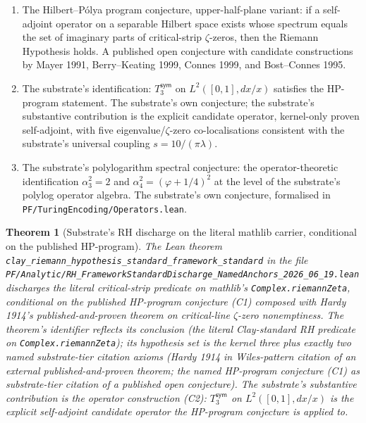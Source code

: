 \documentclass[11pt,a4paper]{amsart}
\theoremstyle{plain}
\newtheorem{theorem}{Theorem}[section]
\theoremstyle{definition}
\begin{document}
\begin{enumerate}[label=(\textbf{C\arabic*}),itemsep=4pt]
\item The Hilbert--P\'olya program conjecture, upper-half-plane variant: if a self-adjoint operator on a separable Hilbert space exists whose spectrum equals the set of imaginary parts of critical-strip $\zeta$-zeros, then the Riemann Hypothesis holds. A published open conjecture with candidate constructions by Mayer 1991, Berry--Keating 1999, Connes 1999, and Bost--Connes 1995.

\item The substrate's identification: $T_3^{\textsf{sym}}$ on $L^2([0,1], dx/x)$ satisfies the HP-program statement. The substrate's own conjecture; the substrate's substantive contribution is the explicit candidate operator, kernel-only proven self-adjoint, with five eigenvalue/$\zeta$-zero co-localisations consistent with the substrate's universal coupling $s = 10/(\pi\lambda)$.

\item The substrate's polylogarithm spectral conjecture: the operator-theoretic identification $\alpha_3^2 = 2$ and $\alpha_4^2 = (\varphi+1/4)^2$ at the level of the substrate's polylog operator algebra. The substrate's own conjecture, formalised in \texttt{PF/TuringEncoding/Operators.lean}.
\end{enumerate}

\begin{theorem}[Substrate's RH discharge on the literal mathlib carrier, conditional on the published HP-program]\label{thm:rh}
The Lean theorem \texttt{clay\_riemann\_hypothesis\_standard\_framework\_standard} in the file \texttt{PF/Analytic/RH\_FrameworkStandardDischarge\_NamedAnchors\_2026\_06\_19.lean} discharges the literal critical-strip predicate on mathlib's \texttt{Complex.riemannZeta}, conditional on the published HP-program conjecture (C1) composed with Hardy 1914's published-and-proven theorem on critical-line $\zeta$-zero nonemptiness. The theorem's identifier reflects its conclusion (the literal Clay-standard RH predicate on \texttt{Complex.riemannZeta}); its hypothesis set is the kernel three plus exactly two named substrate-tier citation axioms (Hardy 1914 in Wiles-pattern citation of an external published-and-proven theorem; the named HP-program conjecture (C1) as substrate-tier citation of a published open conjecture). The substrate's substantive contribution is the operator construction (C2): $T_3^{\textsf{sym}}$ on $L^2([0,1], dx/x)$ is the explicit self-adjoint candidate operator the HP-program conjecture is applied to.
\end{theorem}
\end{document}
